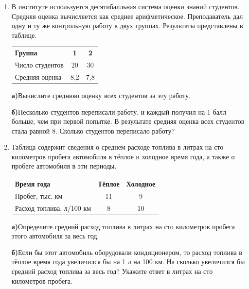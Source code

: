 \documentclass[a4paper,12pt]{article}
\newcommand{\taskspace}{\par\vspace{0.42cm}}
\newcommand{\subtask}[2]{\par\medskip\textbf{#1}\enspace #2\par\vspace{0.22cm}}
\begin{document}
\begin{enumerate}[resume]

\item В институте используется десятибалльная система оценки знаний студентов. Средняя оценка вычисляется как среднее арифметическое. Преподаватель дал одну и ту же контрольную работу в двух группах. Результаты представлены в таблице.
\begin{center}
\renewcommand{\arraystretch}{1.22}
\begin{tabular}{@{}lcc@{}}\textbf{Группа} & \textbf{1} & \textbf{2} \\
Число студентов & 20 & 30 \\
Средняя оценка & 8,2 & 7,8\end{tabular}
\end{center}
\subtask{а)}{Вычислите среднюю оценку всех студентов за эту работу.}
\subtask{б)}{Несколько студентов переписали работу, и каждый получил на 1 балл больше, чем при первой попытке. В результате средняя оценка всех студентов стала равной 8. Сколько студентов переписало работу?}

\taskspace

\item Таблица содержит сведения о среднем расходе топлива в литрах на сто километров пробега автомобиля в тёплое и холодное время года, а также о пробеге автомобиля в эти периоды.
\begin{center}
\renewcommand{\arraystretch}{1.22}
\begin{tabular}{@{}lcc@{}}\textbf{Время года} & \textbf{Тёплое} & \textbf{Холодное} \\
Пробег, тыс. км & 11 & 9 \\
Расход топлива, л/100 км & 8 & 10\end{tabular}
\end{center}
\subtask{а)}{Определите средний расход топлива в литрах на сто километров пробега этого автомобиля за весь год.}
\subtask{б)}{Если бы этот автомобиль оборудовали кондиционером, то расход топлива в тёплое время года увеличился бы на 1 л на 100 км. На сколько увеличился бы средний расход топлива за весь год? Укажите ответ в литрах на сто километров пробега.}

\taskspace


\end{enumerate}
\end{document}
